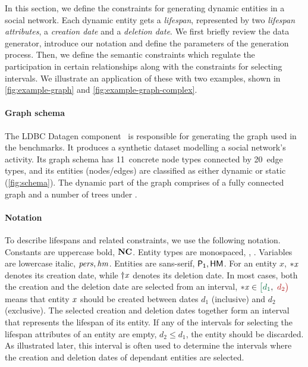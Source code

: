 
In this section, we define the constraints for generating dynamic entities in a social network. Each dynamic entity gets a \emph{lifespan}, represented by two \emph{lifespan attributes}, a \emph{creation date} and a \emph{deletion date}.
We first briefly review the data generator, introduce our notation and define the parameters of the generation process. Then, we define the semantic constraints which regulate the participation in certain relationships along with the constraints for selecting intervals. We illustrate an application of these with two examples, shown in \autoref{fig:example-graph} and \autoref{fig:example-graph-complex}.

\paragraph{Graph schema}

The LDBC Datagen component~\cite{Pham2012,Datagen} is responsible for generating the graph used in the benchmarks. It produces a synthetic dataset modelling a social network's activity. Its graph schema has 11~concrete node types connected by 20~edge types, and its entities (nodes/edges) are classified as either dynamic or static (\autoref{fig:schema}).
The dynamic part of the graph comprises of a fully connected \tPerson graph and a number of \tMessage trees under \tForums.

\paragraph{Notation}
To describe lifespans and related constraints, we use the following notation.
Constants are uppercase bold, \eg $\textbf{NC}$.
Entity types are monospaced, \eg \tPerson, \tHasMember.
Variables are lowercase italic, \eg $\mathit{pers}, \mathit{hm}$.
Entities are sans-serif, \eg $\mathsf{P_1}, \mathsf{HM}$.
For an entity $x$, ${\ast}\mathit{x}{}$ denotes its creation date, while ${\dagger}\mathit{x}{}$ denotes its deletion date.
In most cases, both the creation and the deletion date are selected from an interval, \eg $\varc{x}{} \in \interval{d_1}{d_2}$ means that entity $\mathit{x}$ should be created between dates $d_1$ (inclusive) and $d_2$ (exclusive).
The selected creation and deletion dates together form an interval that represents the lifespan of its entity.
If any of the intervals for selecting the lifespan attributes of an entity are empty, \ie $d_2 \leq d_1$, the entity should be discarded.
As illustrated later, this interval is often used to determine the intervals where the creation and deletion dates of dependant entities are selected.

